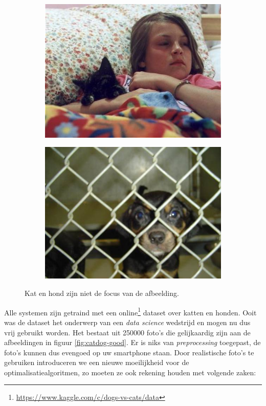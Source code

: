 \begin{figure}
    \begin{subfigure}{.5\textwidth}
        \centering
        \includegraphics[width=.8\linewidth]{img/bad_cat.jpg}
        \label{fig:cat-bad}
    \end{subfigure}%
    \begin{subfigure}{.5\textwidth}
        \centering
        \includegraphics[width=.8\linewidth]{img/bad_dog.jpg}
        \label{fig:dog-bad}
    \end{subfigure}
    \caption{Kat en hond zijn niet de focus van de afbeelding.}
    \label{fig:catdog-bad}
\end{figure}

Alle systemen zijn getraind met een online\footnote{\url{https://www.kaggle.com/c/dogs-vs-cats/data}} dataset over katten en honden. Ooit was de dataset het onderwerp van een \textit{data science} wedstrijd en mogen nu dus vrij gebruikt worden. Het bestaat uit 250000 foto's die gelijkaardig zijn aan de afbeeldingen in figuur \ref{fig:catdog-good}. Er is niks van \textit{preprocessing} toegepast, de foto's kunnen dus evengoed op uw smartphone staan. Door realistische foto's te gebruiken introduceren we een nieuwe moeilijkheid voor de optimalisatiealgoritmen, zo moeten ze ook rekening houden met volgende zaken: 

